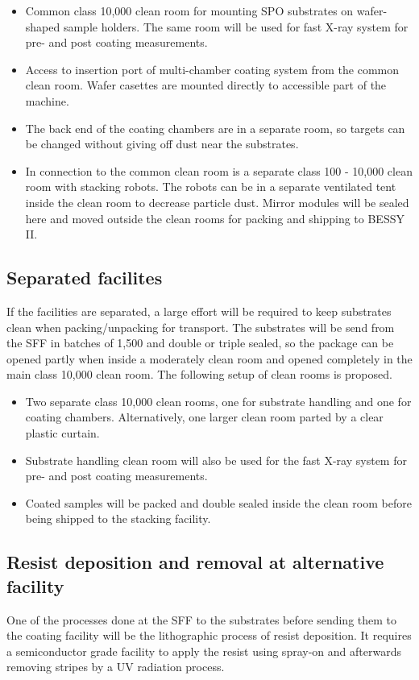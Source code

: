 \begin{itemize}
	\item Common class 10,000 clean room for mounting SPO substrates on wafer-shaped sample holders. The same room will be used for fast X-ray system for pre- and post coating measurements.
	\item Access to insertion port of multi-chamber coating system from the common clean room. Wafer casettes are mounted directly to accessible part of the machine.
	\item The back end of the coating chambers are in a separate room, so targets can be changed without giving off dust near the substrates.
	\item In connection to the common clean room is a separate class 100 - 10,000 clean room with stacking robots. The robots can be in a separate ventilated tent inside the clean room to decrease particle dust. Mirror modules will be sealed here and moved outside the clean rooms for packing and shipping to BESSY II.
\end{itemize}

\subsection{Separated facilites}
If the facilities are separated, a large effort will be required to keep substrates clean when packing/unpacking for transport. The substrates will be send from the SFF in batches of 1,500 and double or triple sealed, so the package can be opened partly when inside a moderately clean room and opened completely in the main class 10,000 clean room. The following setup of clean rooms is proposed.

\begin{itemize}
	\item Two separate class 10,000 clean rooms, one for substrate handling and one for coating chambers. Alternatively, one larger clean room parted by a clear plastic curtain.
	\item Substrate handling clean room will also be used for the fast X-ray system for pre- and post coating measurements.
	\item Coated samples will be packed and double sealed inside the clean room before being shipped to the stacking facility.
\end{itemize}

\subsection{Resist deposition and removal at alternative facility}
One of the processes done at the SFF to the substrates before sending them to the coating facility will be the lithographic process of resist deposition. It requires a semiconductor grade facility to apply the resist using spray-on and afterwards removing stripes by a UV radiation process.

